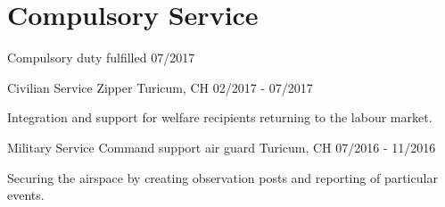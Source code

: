 \section{Compulsory Service}
\cventry
{Compulsory duty fulfilled} %
{} %
{} %
{07/2017} %

\cventry
{Civilian Service} %
{Zipper} %
{Turicum, CH} %
{02/2017 - 07/2017} %
\begin{cvitems}
\item {Integration and support for welfare recipients returning to the labour market.}
\end{cvitems}

\cventry
{Military Service} %
{Command support air guard} %
{Turicum, CH} %
{07/2016 - 11/2016} %
\begin{cvitems}
\item {Securing the airspace by creating observation posts and  reporting of particular events.}
\end{cvitems}